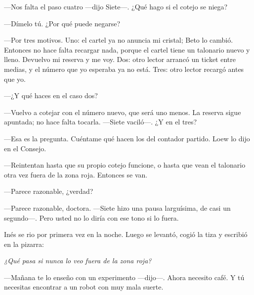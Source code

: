 ---Nos falta el paso cuatro ---dijo Siete---\nobreak. ¿Qué hago si el cotejo se niega?

---Dímelo tú. ¿Por qué puede negarse?

---Por tres motivos. Uno: el cartel ya no anuncia mi cristal; Beto lo cambió. Entonces no hace falta recargar nada, porque el cartel tiene un talonario nuevo y lleno. Devuelvo mi reserva y me voy. Dos: otro lector arrancó un ticket entre medias, y el número que yo esperaba ya no está. Tres: otro lector recargó antes que yo.

---¿Y qué haces en el caso dos?

---Vuelvo a cotejar con el número nuevo, que será uno menos. La reserva sigue apuntada; no hace falta tocarla. ---Siete vaciló---\nobreak. ¿Y en el tres?

---Esa es la pregunta. Cuéntame qué hacen los del contador partido. Loew lo dijo en el Consejo.

---Reintentan hasta que su propio cotejo funcione, o hasta que vean el talonario otra vez fuera de la zona roja. Entonces se van.

---Parece razonable, ¿verdad?

---Parece razonable, doctora. ---Siete hizo una pausa larguísima, de casi un segundo---\nobreak. Pero usted no lo diría con ese tono si lo fuera.

Inés se rio por primera vez en la noche. Luego se levantó, cogió la tiza y escribió en la pizarra:

\begin{center}
\emph{¿Qué pasa si nunca lo veo fuera de la zona roja?}
\end{center}

---Mañana te lo enseño con un experimento ---dijo---\nobreak. Ahora necesito café. Y tú necesitas encontrar a un robot con muy mala suerte.
